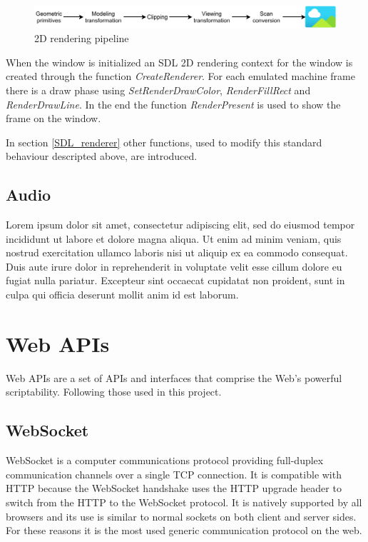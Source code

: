\begin{figure}[H]
	\includegraphics[width=\linewidth]{immagini/rendering_pipeline}
	\caption{2D rendering pipeline}
	\label{fig:rendering_pipeline}
\end{figure}

When the window is initialized an SDL 2D rendering context for the window is created through the function \textit{CreateRenderer}. For each emulated machine frame there is a draw phase using \textit{SetRenderDrawColor}, \textit{RenderFillRect} and \textit{RenderDrawLine}. In the end the function \textit{RenderPresent} is used to show the frame on the window.

In section \ref{SDL_renderer} other functions, used to modify this standard behaviour descripted above, are introduced.


\subsection{Audio}
Lorem ipsum dolor sit amet, consectetur adipiscing elit, sed do eiusmod tempor incididunt ut labore et dolore magna aliqua. Ut enim ad minim veniam, quis nostrud exercitation ullamco laboris nisi ut aliquip ex ea commodo consequat. Duis aute irure dolor in reprehenderit in voluptate velit esse cillum dolore eu fugiat nulla pariatur. Excepteur sint occaecat cupidatat non proident, sunt in culpa qui officia deserunt mollit anim id est laborum.



\section{Web APIs}
Web APIs are a set of APIs and interfaces that comprise the Web's powerful scriptability. Following those used in this project\cite{Web_APIs}.

\subsection{WebSocket}
WebSocket is a computer communications protocol providing full-duplex communication channels over a single TCP connection. It is compatible with HTTP because the WebSocket handshake uses the HTTP upgrade header to switch from the HTTP to the WebSocket protocol. It is natively supported by all browsers and its use is similar to normal sockets on both client and server sides. For these reasons it is the most used generic communication protocol on the web\cite{WebSocket_Web_APIs}.

